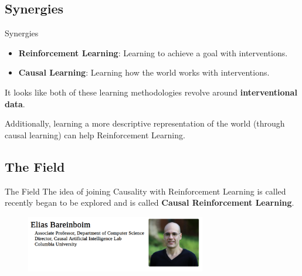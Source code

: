 \subsection{Synergies}

\begin{frame}{Synergies}
    \begin{itemize}
        \item \textbf{Reinforcement Learning}: Learning to achieve a goal with interventions.
        \item \textbf{Causal Learning}: Learning how the world works with interventions.
    \end{itemize}

    \pause
    \vspace{1cm}
    It looks like both of these learning methodologies revolve around \textbf{interventional data}.

    Additionally, learning a more descriptive representation of the world (through causal learning) can help
    Reinforcement Learning.
\end{frame}
\subsection{The Field}

\begin{frame}{The Field}
    The idea of joining Causality with Reinforcement Learning 
    is called recently began to be explored and is called \textbf{Causal Reinforcement Learning}.

    \begin{figure}[l]
        \centering
        \vspace{0pt}
        \includegraphics[width=0.7\textwidth]{img/elias.png}
    \end{figure}


\end{frame}